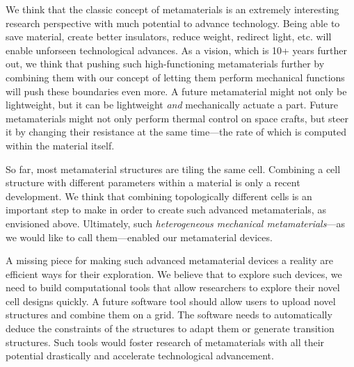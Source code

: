 We think that the classic concept of metamaterials is an extremely interesting research perspective with much potential to advance technology. Being able to save material, create better insulators, reduce weight, redirect light, etc. will enable unforseen technological advances. As a vision, which is 10+ years further out, we think that pushing such high-functioning metamaterials further by combining them with our concept of letting them perform mechanical functions will push these boundaries even more. A future metamaterial might not only be lightweight, but it can be lightweight \textit{and} mechanically actuate a part. Future metamaterials might not only perform thermal control on space crafts, but steer it by changing their resistance at the same time---the rate of which is computed within the material itself.

So far, most metamaterial structures are tiling the same cell. Combining a cell structure with different parameters within a material is only a recent development. We think that combining topologically different cells is an important step to make in order to create such advanced metamaterials, as envisioned above. Ultimately, such \textit{heterogeneous mechanical metamaterials}---as we would like to call them---enabled our metamaterial devices. 

A missing piece for making such advanced metamaterial devices a reality are efficient ways for their exploration. We believe that to explore such devices, we need to build computational tools that allow researchers to explore their novel cell designs quickly. A future software tool should allow users to upload novel structures and combine them on a grid. The software needs to automatically deduce the constraints of the structures to adapt them or generate transition structures. Such tools would foster research of metamaterials with all their potential drastically and accelerate technological advancement. 





